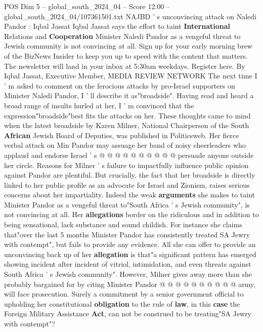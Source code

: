 \begin{textsample}{POS Dim 5 – global\_south\_2024\_04 – Score 12.00 – global\_south\_2024\_04/107361501.txt}  \label{ex:f5_pos_273}
NAJBD ' s unconvincing attack on Naledi Pandor : Iqbal Jassat Iqbal Jassat says the effort to taint \textbf{International} Relations and \textbf{Cooperation} Minister Naledi Pandor as a vengeful threat to Jewish community is not convincing at all.
Sign up for your early morning brew of the BizNews Insider to keep you up to speed with the content that matters.
The newsletter will land in your inbox at 5:30am weekdays.
Register here.
By Iqbal Jassat, Executive Member, MEDIA REVIEW NETWORK The next time I ' m asked to comment on the ferocious attacks by pro-Israel supporters on Minister Naledi Pandor, I ' ll describe it as"broadside".
Having read and heard a broad range of insults hurled at her, I ' m convinced that the expression"broadside"best fits the attacks on her.
These thoughts came to mind when the latest broadside by Karen Milner, National Chairperson of the South \textbf{African} Jewish Board of Deputies, was published in Politicsweb.
Her fierce verbal attack on Min Pandor may assuage her band of noisy cheerleaders who applaud and endorse Israel ' s @ @ @ @ @ @ @ @ @ @ persuade anyone outside her circle.
Reasons for Milner ' s failure to impactfully influence public opinion against Pandor are plentiful.
But crucially, the fact that her broadside is directly linked to her public profile as an advocate for Israel and Zionism, raises serious concerns about her impartiality.
Indeed the weak \textbf{arguments} she makes to taint Minister Pandor as a vengeful threat to"South Africa ' s Jewish community", is not convincing at all.
Her \textbf{allegations} border on the ridiculous and in addition to being sensational, lack substance and sound childish.
For instance she claims that"over the last 5 months Minister Pandor has consistently treated SA Jewry with contempt", but fails to provide any evidence.
All she can offer to provide an unconvincing back up of her \textbf{allegation} is that"a significant pattern has emerged showing incident after incident of vitriol, intimidation, and even threats against South Africa ' s Jewish community".
However, Milner gives away more than she probably bargained for by citing Minister Pandor @ @ @ @ @ @ @ @ @ @ army, will face prosecution.
Surely a commitment by a senior government official to upholding her constitutional \textbf{obligation} to the rule of \textbf{law}, in this \textbf{case} the Foreign Military Assistance \textbf{Act}, can not be construed to be treating"SA Jewry with contempt"?

\end{textsample}
